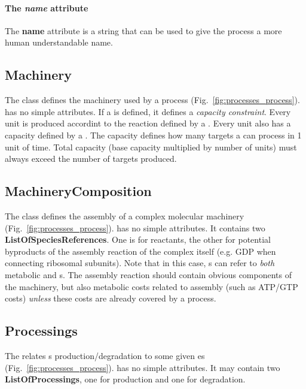 \paragraph{The \textit{name} attribute}
The \textbf{name} attribute is a string that can be used to give the process
a more human understandable name.


\subsection{Machinery}
\label{sec:machinery}

The \machinery{} class defines the machinery used by a process
(Fig.~\ref{fig:processes_process}).
\machinery{} has no simple attributes.
If a \machinery{} is defined, it defines a \emph{capacity constraint}.
Every \machinery{} unit is produced accordint to the reaction
defined by a \machinerycomposition.
Every unit also has a capacity defined by a \targetvalue.
The capacity defines how many targets a \machinery{} can process in 1 unit of
time.
Total capacity (base capacity multiplied by number of \machinery{} units)
must always exceed the number of targets produced.


\subsection{MachineryComposition}
\label{sec:machinery_composition}

The \machinerycomposition{} class defines the assembly of a complex
molecular machinery (Fig.~\ref{fig:processes_process}).
\machinerycomposition{} has no simple attributes.
It contains two \textbf{ListOfSpeciesReferences}.
One is for reactants, the other for potential byproducts of the assembly reaction
of the complex itself (e.g. GDP when connecting ribosomal subunits).
Note that in this case, \speciesreference{}s can refer to \emph{both}
metabolic \species{} and \macromolecule{}s.
The assembly reaction should contain obvious components of the machinery,
but also metabolic costs related to assembly (such as ATP/GTP costs)
\emph{unless} these costs are already covered by a process.


\subsection{Processings}
\label{sec:processings}

The \processings{} relates \macromolecule{}s production/degradation to
some given \process{}es (Fig.~\ref{fig:processes_process}).
\processings{} has no simple attributes.
It may contain two \textbf{ListOfProcessings}, one for production and one for
degradation.


